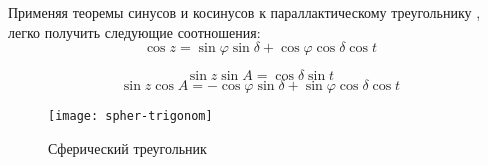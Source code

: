 Применяя теоремы синусов и косинусов к параллактическому треугольнику , легко получить следующие соотношения:
\begin{equation}
\cos z=\sin\varphi\sin\delta+\cos\varphi\cos\delta\cos t\end{equation}

\begin{equation}
\sin z\sin A=\cos\delta\sin t
\end{equation}
\begin{equation}
\sin z\cos A=-\cos\varphi\sin\delta+\sin\varphi\cos\delta\cos t
\end{equation}

\begin{figure}[!h]
\centering
 \texttt{[image: spher-trigonom]}
 \caption{Сферический треугольник}
\end{figure}




